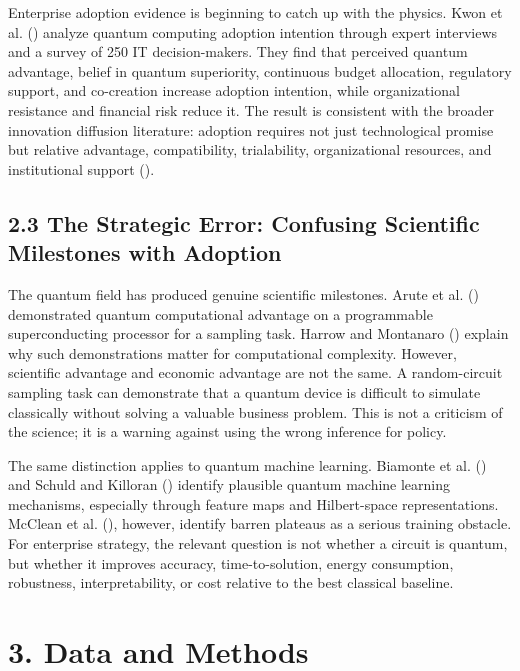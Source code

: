 \documentclass[
  11pt,
  letterpaper,
]{article}
\begin{document}
Enterprise adoption evidence is beginning to catch up with the physics.
Kwon et al. () analyze quantum computing
adoption intention through expert interviews and a survey of 250 IT
decision-makers. They find that perceived quantum advantage, belief in
quantum superiority, continuous budget allocation, regulatory support,
and co-creation increase adoption intention, while organizational
resistance and financial risk reduce it. The result is consistent with
the broader innovation diffusion literature: adoption requires not just
technological promise but relative advantage, compatibility,
trialability, organizational resources, and institutional support
().

\subsection{2.3 The Strategic Error: Confusing Scientific Milestones
with
Adoption}\label{the-strategic-error-confusing-scientific-milestones-with-adoption}

The quantum field has produced genuine scientific milestones. Arute et
al. () demonstrated quantum computational
advantage on a programmable superconducting processor for a sampling
task. Harrow and Montanaro () explain why
such demonstrations matter for computational complexity. However,
scientific advantage and economic advantage are not the same. A
random-circuit sampling task can demonstrate that a quantum device is
difficult to simulate classically without solving a valuable business
problem. This is not a criticism of the science; it is a warning against
using the wrong inference for policy.

The same distinction applies to quantum machine learning. Biamonte et
al. () and Schuld and Killoran
() identify plausible quantum machine
learning mechanisms, especially through feature maps and Hilbert-space
representations. McClean et al. (),
however, identify barren plateaus as a serious training obstacle. For
enterprise strategy, the relevant question is not whether a circuit is
quantum, but whether it improves accuracy, time-to-solution, energy
consumption, robustness, interpretability, or cost relative to the best
classical baseline.

\section{3. Data and Methods}\label{data-and-methods}
\end{document}
